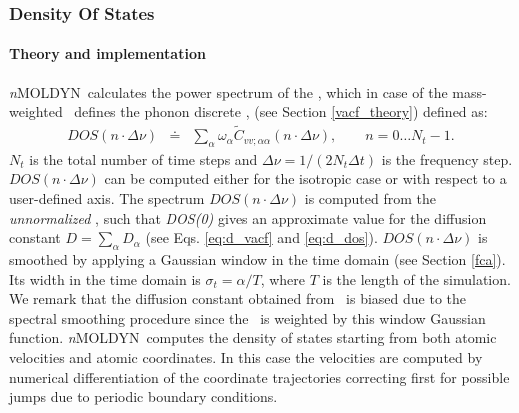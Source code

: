 \documentclass[a4paper,11pt]{report}
\newcommand{\NMOLDYN}{\textit{n}MOLDYN}
\begin{document}
\subsubsection{Density Of States}
\label{dos}
\paragraph{Theory and implementation\\}
\label{dos_theory}
\NMOLDYN\ calculates the power spectrum of the \VACF, which in case of the mass-weighted \VACF\ defines the phonon 
discrete \DOS, (see Section \ref{vacf_theory}) defined as:
\begin{eqnarray}
DOS(n\cdot\Delta \nu)  &\doteq &\sum_{\alpha} \omega_\alpha 
\tilde C_{vv ; \alpha\alpha}(n\cdot\Delta \nu),\qquad n = 0\ldots N_t - 1.
\end{eqnarray}
$N_t$ is the total number of time steps and $\Delta\nu = 1/(2N_t \Delta t)$ is the frequency step. $DOS(n\cdot\Delta\nu)$ can 
be computed either for the isotropic case or with respect to a user-defined axis. The spectrum $DOS(n\cdot\Delta \nu)$ is computed from the 
\textit{unnormalized} \VACF, such that \textit{DOS(0)} gives an approximate value for the diffusion constant 
$D = \sum_\alpha D_\alpha$ (see Eqs. \ref{eq:d_vacf} and \ref{eq:d_dos}). $DOS(n\cdot\Delta \nu)$ is smoothed by 
applying a Gaussian window in the time domain \cite{Harris} (see Section \ref{fca}). Its width in the time domain is 
$\sigma_t=\alpha/T$, where $T$ is the length of 
the simulation. We remark that the diffusion constant obtained from \DOS\ is biased due to the spectral smoothing procedure since 
the \VACF\ is weighted by this window Gaussian function. \NMOLDYN\ computes the density of states starting from both atomic velocities 
and atomic coordinates. In this case the velocities are computed by numerical differentiation of the coordinate trajectories correcting 
first for possible jumps due to periodic boundary conditions.
\end{document}
